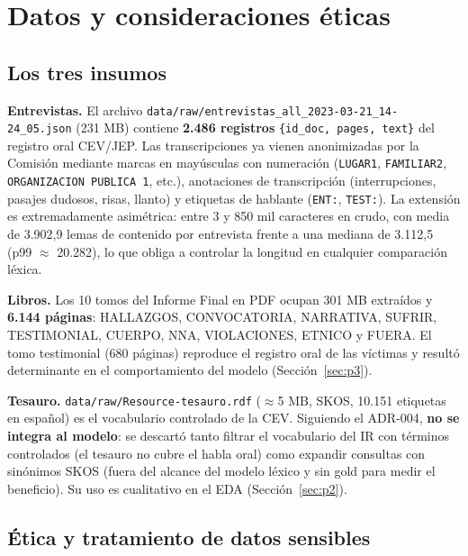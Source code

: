 \documentclass[11pt]{tg_usta}
\begin{document}
\section{Datos y consideraciones éticas}\label{sec:datos}

\subsection{Los tres insumos}

\textbf{Entrevistas.} El archivo \texttt{data/raw/entrevistas\_all\_2023-03-21\_14-24\_05.json} (231 MB) contiene \textbf{2.486 registros} \texttt{\{id\_doc, pages, text\}} del registro oral CEV/JEP. Las transcripciones ya vienen anonimizadas por la Comisión mediante marcas en mayúsculas con numeración (\texttt{LUGAR1}, \texttt{FAMILIAR2}, \texttt{ORGANIZACION PUBLICA 1}, etc.), anotaciones de transcripción (interrupciones, pasajes dudosos, risas, llanto) y etiquetas de hablante (\texttt{ENT:}, \texttt{TEST:}). La extensión es extremadamente asimétrica: entre 3 y 850 mil caracteres en crudo, con media de 3.902,9 lemas de contenido por entrevista frente a una mediana de 3.112,5 (p99 $\approx$ 20.282), lo que obliga a controlar la longitud en cualquier comparación léxica.

\textbf{Libros.} Los 10 tomos del Informe Final en PDF ocupan 301 MB extraídos y \textbf{6.144 páginas}: HALLAZGOS, CONVOCATORIA, NARRATIVA, SUFRIR, TESTIMONIAL, CUERPO, NNA, VIOLACIONES, ETNICO y FUERA. El tomo testimonial (680 páginas) reproduce el registro oral de las víctimas y resultó determinante en el comportamiento del modelo (Sección~\ref{sec:p3}).

\textbf{Tesauro.} \texttt{data/raw/Resource-tesauro.rdf} ($\approx$5 MB, SKOS, 10.151 etiquetas en español) es el vocabulario controlado de la CEV. Siguiendo el ADR-004, \textbf{no se integra al modelo}: se descartó tanto filtrar el vocabulario del IR con términos controlados (el tesauro no cubre el habla oral) como expandir consultas con sinónimos SKOS (fuera del alcance del modelo léxico y sin gold para medir el beneficio). Su uso es cualitativo en el EDA (Sección~\ref{sec:p2}).

\subsection{Ética y tratamiento de datos sensibles}
\end{document}
